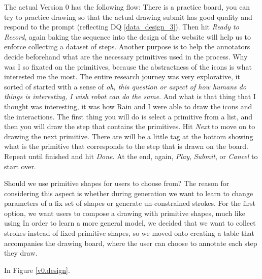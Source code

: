 The actual Version 0 has the following flow:
There is a practice board, you can try to practice drawing so that the actual drawing submit has good quality and respond to the prompt (reflecting DQ \ref{data_design_3}). Then hit \textit{Ready to Record}, again baking the sequence into the design of the website will help us to enforce collecting a dataset of steps. Another purpose is to help the annotators decide beforehand what are the necessary primitives used in the process. Why was I so fixated on the primitives, because the abstractness of the icons is what interested me the most. The entire research journey was very explorative, it sorted of started with a sense of \textit{oh, this question or aspect of how humans do things is interesting, I wish robot can do the same}. And what is that thing that I thought was interesting, it was how Rain and I were able to draw the icons and the interactions. 
The first thing you will do is select a primitive from a list, and then you will draw the step that contains the primitives. Hit \textit{Next} to move on to drawing the next primitive. There are will be a little tag at the bottom showing what is the primitive that corresponds to the step that is drawn on the board. Repeat until finished and hit \textit{Done}. At the end, again, \textit{Play}, \textit{Submit}, or \textit{Cancel} to start over. 

{\color{red} } Should we use primitive shapes for users to choose from? 
The reason for considering this aspect is whether during generation we want to learn to change parameters of a fix set of shapes or generate un-constrained strokes. For the first option, we want users to compose a drawing with primitive shapes, much like using   
In order to learn a more general model, we decided that we want to collect strokes instead of fixed primitive shapes, so we moved onto creating a table that accompanies the drawing board, where the user can choose to annotate each step they draw. 

In Figure \ref{v0.design}. 

